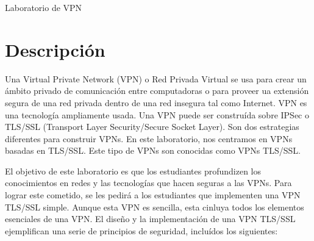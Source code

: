 
\newcommand{\commonfolder}{../../common-files}





\usepackage{longtable}
\usepackage{enumitem}
\usepackage{stackengine}
\newcommand\xrowht[2][0]{\addstackgap[.5\dimexpr#2\relax]{\vphantom{#1}}}



\newcommand{\miniVPN}{{\tt MiniVPN}\xspace}
\newcommand{\hostu}{{\tt U}\xspace}
\newcommand{\hostv}{{\tt V}\xspace}


\newcommand{\vpnFigs}{./Figs}





\begin{center}
{\LARGE Laboratorio de VPN}
\end{center}




\section{Descripción}

Una Virtual Private Network (VPN) o Red Privada Virtual se usa para crear un ámbito privado de comunicación entre computadoras o para proveer ua extensión segura de una red privada dentro de una red insegura tal como Internet. VPN es una tecnología ampliamente usada. Una VPN puede ser construída sobre IPSec o TLS/SSL (Transport Layer Security/Secure Socket Layer). 
Son dos estrategias diferentes para construir VPNs. En este laboratorio, nos centramos en VPNs basadas en  TLS/SSL. Este tipo de VPNs son conocidas como VPNs TLS/SSL.

El objetivo de este laboratorio es que los estudiantes profundizen los conocimientos en redes y las tecnologías que hacen seguras a las VPNs. Para lograr este cometido, se les pedirá a los estudiantes que implementen una VPN TLS/SSL simple.
Aunque esta VPN es sencilla, esta cinluya todos los elementos esenciales de una VPN. El diseño y la implementación de una VPN TLS/SSL ejemplifican
una serie de principios de seguridad, incluídos los siguientes:


